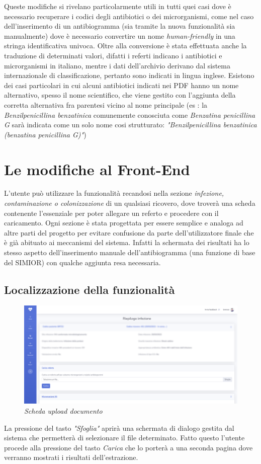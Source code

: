Queste modifiche si rivelano particolarmente utili in tutti quei casi dove è necessario recuperare i codici degli antibiotici o dei microrganismi, come nel caso dell'inserimento di un antibiogramma (sia tramite la nuova funzionalità sia manualmente) dove è necessario convertire un nome \textit{human-friendly} in una stringa identificativa univoca.
Oltre alla conversione è stata effettuata anche la traduzione di determinati valori, difatti i referti indicano i antibiotici e microrganismi in italiano, mentre i dati dell'archivio derivano dal sistema internazionale di classificazione, pertanto sono indicati in lingua inglese. Esistono dei casi particolari in cui alcuni antibiotici indicati nei PDF hanno un nome alternativo, spesso il nome scientifico, che viene gestito con l'aggiunta della corretta alternativa fra parentesi vicino al nome principale (es : la \textit{Benzilpenicillina benzatinica} comunemente conosciuta come \textit{Benzatina penicillina G} sarà indicata come un solo nome cosi strutturato: \textit{"Benzilpenicillina benzatinica (benzatina penicillina G)"})
\newpage
\section{Le modifiche al Front-End}
L'utente può utilizzare la funzionalità recandosi nella sezione \textit{infezione, contaminazione o colonizzazione} di un qualsiasi ricovero, dove troverà una scheda contenente l'essenziale per poter allegare un referto e procedere con il caricamento.
Ogni sezione è stata progettata per essere semplice e analoga ad altre parti del progetto per evitare confusione da parte dell'utilizzatore finale che è già abituato ai meccanismi del sistema. Infatti la schermata dei risultati ha lo stesso aspetto dell'inserimento manuale dell'antibiogramma (una funzione di base del SIMIOR) con qualche aggiunta resa necessaria.
\subsection{Localizzazione della funzionalità}
\begin{figure}[h!]
	\centering
	\includegraphics[width=.99\columnwidth]{images/feature_location.png}
	\caption{\textit{Scheda upload documento}}
	\label{fig:feature_location}
\end{figure}
La pressione del tasto \textit{"Sfoglia"} aprirà una schermata di dialogo gestita dal sistema che permetterà di selezionare il file determinato. Fatto questo l'utente procede alla pressione del tasto \textit{Carica} che lo porterà a una seconda pagina dove verranno mostrati i risultati dell'estrazione.
\newpage
